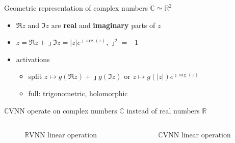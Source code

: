 \documentclass{beamer}
\newcommand{\real}{\mathbb{R}}
\newcommand{\cplx}{\mathbb{C}}
\newcommand{\iu}{{\jmath}}
\begin{document}
\begin{frame}[c]{\insertsection}
  Geometric representation of complex numbers $\cplx \simeq \real^2$
  \begin{itemize}
    \item $\Re{z}$ and $\Im{z}$ are \textbf{real} and \textbf{imaginary} parts of $z$
    \item $z = \Re{z} + \iu \Im{z} = \lvert z \rvert e^{\iu \arg{\!(z)}}$, $\iu^2 = -1$

  \item activations
    \begin{itemize}
      \item split $
        z \mapsto g(\Re{z}) + \iu g(\Im{z}) %
      $ or $
        z \mapsto g(\lvert z\rvert) e^{\iu \arg{\!(z)}}
      $ %
      \item full: trigonometric, holomorphic
    \end{itemize}
  \end{itemize}

  \bigskip
  $\cplx$VNN operate on complex numbers $\cplx$ instead of real numbers $\real$
  \vspace{-1em}
  \begin{columns}[T]
    \begin{column}{0.45\linewidth}
      \begin{figure}
          
        {$\real$VNN linear operation}
      \end{figure}
    \end{column}%
    \begin{column}{0.45\linewidth}
      \begin{figure}
          
        {$\cplx$VNN linear operation}
      \end{figure}
    \end{column}
  \end{columns}


\end{frame}
\end{document}
